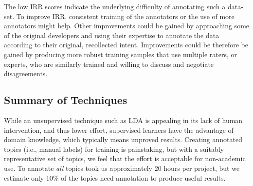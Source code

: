 \documentclass[smallextended]{svjour3}       %
\begin{document}
The low IRR scores indicate
the underlying difficulty of annotating such a data-set. To improve IRR,
consistent training of the annotators or the use of more annotators might help.
Other improvements could be gained by approaching some of the original developers
and using their expertise to annotate the data according to their original, recollected intent.
Improvements
could be therefore be gained by producing more robust training samples that use
multiple raters, or experts, who are similarly trained and willing to discuss and
negotiate disagreements.









\subsection{Summary of Techniques}
While an unsupervised technique such as LDA is appealing in its lack of human intervention, and thus lower effort, 
supervised learners have the advantage of domain knowledge, which typically means improved results. 
Creating annotated topics (i.e., manual labels) for training is painstaking, but with a suitably representative set of topics, we feel that the effort is acceptable for non-academic use. To
annotate \emph{all} topics took us approximately 20 hours per project, but we estimate only 10\% of the topics need annotation to produce useful results.
\end{document}
